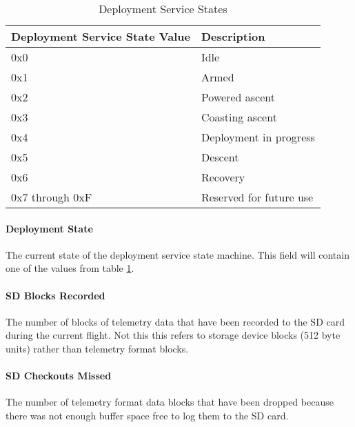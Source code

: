 \begin{table}[H]
    \centering
    \begin{tabular}{@{}ll@{}}
        \toprule
        Deployment Service State Value & Description             \\
        \midrule
        0x0                            & Idle                    \\
        0x1                            & Armed                   \\
        0x2                            & Powered ascent          \\
        0x3                            & Coasting ascent         \\
        0x4                            & Deployment in progress  \\
        0x5                            & Descent                 \\
        0x6                            & Recovery                \\
        0x7 through 0xF                & Reserved for future use \\
        \bottomrule
    \end{tabular}
    \caption{Deployment Service States}
    \label{table:deployment-state}
\end{table}

\paragraph{Deployment State}
The current state of the deployment service state machine. This field will contain one of the values from table
\ref{table:deployment-state}.

\paragraph{SD Blocks Recorded}
The number of blocks of telemetry data that have been recorded to the SD card during the current flight. Not this this
refers to storage device blocks (512 byte units) rather than telemetry format blocks.

\paragraph{SD Checkouts Missed}
The number of telemetry format data blocks that have been dropped because there was not enough buffer space free to log
them to the SD card.
